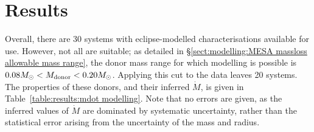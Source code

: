 \label{chpt:results:evolutionary modelling} %

\section{Results}
Overall, there are 30 systems with eclipse-modelled characterisations available for use.
However, not all are suitable; as detailed in \S\ref{sect:modelling:MESA massloss allowable mass range}, the donor mass range for which modelling is possible is $0.08 M_\odot < M_{\rm donor} < 0.20 M_\odot$.
Applying this cut to the data leaves 20 systems.
The properties of these donors, and their inferred $\dot M$, is given in Table~\ref{table:results:mdot modelling}. Note that no errors are given, as the inferred values of $\dot M$ are dominated by systematic uncertainty, rather than the statistical error arising from the uncertainty of the mass and radius.

